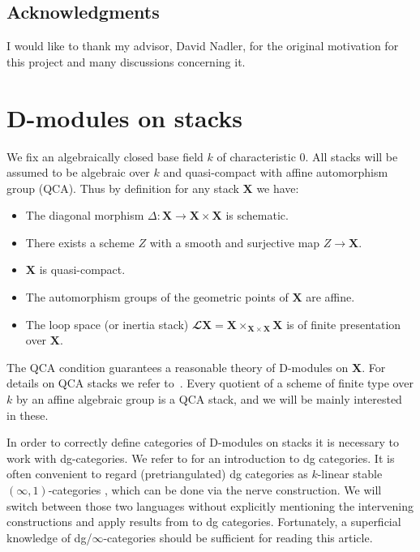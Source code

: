 \documentclass[english]{ck-article}
\let\stack\mathbf
\renewcommand\ls[1]{\mathbfcal{L} #1}
\begin{document}
\subsection*{Acknowledgments}
I would like to thank my advisor, David Nadler, for the original motivation for this project and many discussions concerning it.


\section{D-modules on stacks}
\label{sec:d-mods}

We fix an algebraically closed base field $k$ of characteristic $0$.
All stacks will be assumed to be algebraic over $k$ and quasi-compact with affine automorphism group (QCA).
Thus by definition for any stack $\stack X$ we have:
\begin{itemize}
    \item The diagonal morphism $Δ\colon \stack X → \stack X × \stack X$ is schematic.
    \item There exists a scheme $Z$ with a smooth and surjective map $Z → \stack X$.
    \item $\stack X$ is quasi-compact.
    \item The automorphism groups of the geometric points of $\stack X$ are affine.
    \item The loop space (or inertia stack) $\ls \stack X = \stack X ×_{\stack X × \stack X} \stack X$ is of finite presentation over $\stack X$.
\end{itemize}
The QCA condition guarantees a reasonable theory of D-modules on $\stack X$.
For details on QCA stacks we refer to~\cite{DrinfeldGaitsgory:2013:FinitenessQuestions}.
Every quotient of a scheme of finite type over $k$ by an affine algebraic group is a QCA stack, and we will be mainly interested in these.

In order to correctly define categories of D-modules on stacks it is necessary to work with dg-categories.
We refer to \cite{Keller:2006:OnDGCategories} for an introduction to dg categories.
It is often convenient to regard (pretriangulated) dg categories as $k$-linear stable $(∞,1)$-categories \cite{Lurie:2009:HigherToposTheory,Lurie:2014-draft:HigherAlgebra}, which can be done via the nerve construction.%
We will switch between those two languages without explicitly mentioning the intervening constructions and apply results from \cite{Lurie:2014-draft:HigherAlgebra} to dg categories.
Fortunately, a superficial knowledge of dg/$∞$-categories should be sufficient for reading this article.
\end{document}
